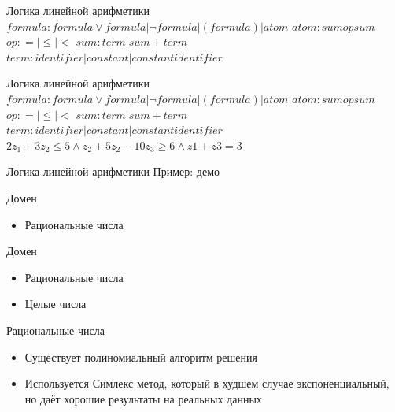 \documentclass{beamer}
\begin{document}
\begin{frame}{Логика линейной арифметики}
$formula: formula \vee formula | \lnot formula | (formula) | atom$\newline
$atom: sum op sum$\newline
$op: = | \le | <$\newline
$sum: term|sum + term$\newline
$term: identifier | constant | constant identifier$\newline
\end{frame}

\begin{frame}{Логика линейной арифметики}
$formula: formula \vee formula | \lnot formula | (formula) | atom$\newline
$atom: sum op sum$\newline
$op: = | \le | <$\newline
$sum: term|sum + term$\newline
$term: identifier | constant | constant identifier$\newline
$2z_1 + 3z_2 \le 5 \wedge z_2 + 5z_2 - 10z_3 \ge 6 \wedge z1 + z3 = 3$
\end{frame}

\begin{frame}{Логика линейной арифметики}
Пример: демо
\end{frame}

\begin{frame}{Домен}
\begin{itemize}
\item Рациональные числа
\end{itemize}
\end{frame}

\begin{frame}{Домен}
\begin{itemize}
\item Рациональные числа
\item Целые числа
\end{itemize}
\end{frame}

\begin{frame}{Рациональные числа}
\begin{itemize}
\item Существует полиномиальный алгоритм решения
\item Используется Симлекс метод, который в худшем случае экспоненциальный, но даёт хорошие результаты на реальных данных
\end{itemize}
\end{frame}
\end{document}
